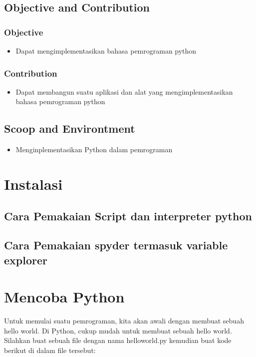 \subsection{Objective and Contribution}
\subsubsection{Objective}
\begin{itemize}
	\item Dapat mengimplementasikan bahasa pemrograman python
\end{itemize}
	
\subsubsection{Contribution}
\begin{itemize}
	\item Dapat membangun suatu aplikasi dan alat yang mengimplementasikan bahasa pemrograman python
\end{itemize}


\subsection{Scoop and Environtment}
\begin{itemize}
	\item Menginplementasikan Python dalam pemrograman
\end{itemize}

\section{Instalasi}
\subsection{Cara Pemakaian Script dan interpreter python}
\subsection{Cara Pemakaian spyder termasuk variable explorer}

\section{Mencoba Python}
Untuk memulai suatu pemrograman, kita akan awali dengan membuat sebuah hello world. Di Python, cukup mudah untuk membuat sebuah hello world. Silahkan buat sebuah file dengan nama helloworld.py kemudian buat kode berikut di dalam file tersebut:
